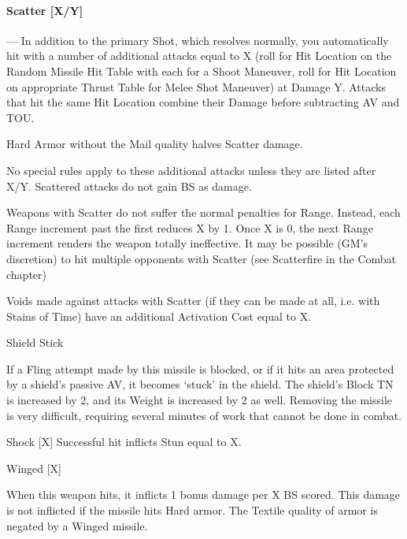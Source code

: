 \documentclass[oneside,11pt,english]{book}
\begin{document}
\vspace{-5pt}\paragraph[Scatter]{\label{rangequal:Scatter [X/Y]}Scatter [X/Y]}---\quad 
In addition to the primary Shot, which resolves normally, you automatically hit with a number of 
additional attacks equal to X (roll for Hit Location on the Random Missile Hit Table with each for a 
Shoot Maneuver, roll for Hit Location on appropriate Thrust Table for Melee Shot Maneuver) at 
Damage Y. Attacks that hit the same Hit Location combine their Damage before subtracting AV and 
TOU. 

Hard Armor without the Mail quality halves Scatter damage. 

No special rules apply to these additional attacks unless they are listed after X/Y. Scattered attacks do 
not gain BS as damage. 

Weapons with Scatter do not suffer the normal penalties for Range. Instead, each Range increment 
past the first reduces X by 1. Once X is 0, the next Range increment renders the weapon totally 
ineffective. It may be possible (GM’s discretion) to hit multiple opponents with Scatter (see 
Scatterfire in the Combat chapter) 

Voids made against attacks with Scatter (if they can be made at all, i.e. with Stains of Time) have an 
additional Activation Cost equal to X. 

Shield Stick 

If a Fling attempt made by this missile is blocked, or if it hits an area protected by a shield’s passive 
AV, it becomes ‘stuck’ in the shield. The shield’s Block TN is increased by 2, and its Weight is 
increased by 2 as well. Removing the missile is very difficult, requiring several minutes of work that 
cannot be done in combat. 

Shock [X] 
Successful hit inflicts Stun equal to X. 

Winged 
[X] 

When this weapon hits, it inflicts 1 bonus damage per X BS scored. This damage is not inflicted if the 
missile hits Hard armor. The Textile quality of armor is negated by a Winged missile. 
\end{document}
